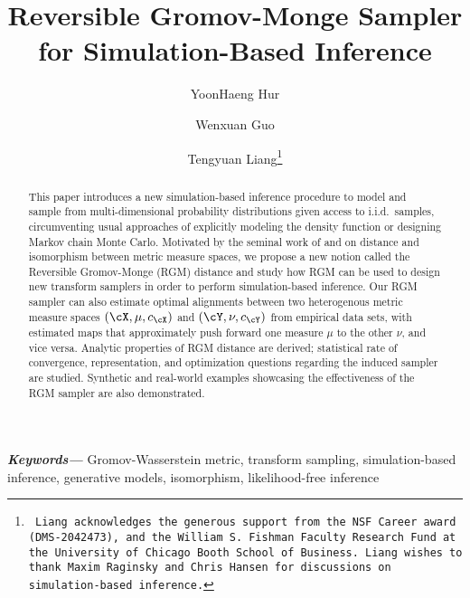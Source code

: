 \documentclass[11pt]{article}
\providecommand{\keywords}[1]{\small \textbf{\textit{Keywords---}} #1}
\begin{document}
\title{Reversible Gromov-Monge Sampler for Simulation-Based Inference}

\author{YoonHaeng Hur}
\author{Wenxuan Guo}
\author{Tengyuan Liang\thanks{\tt 
Liang acknowledges the generous support from the NSF Career award (DMS-2042473), and the William S. Fishman Faculty Research Fund at the University of Chicago Booth School of Business. Liang wishes to thank Maxim Raginsky and Chris Hansen for discussions on simulation-based inference.}}


\maketitle

\begin{abstract}
	This paper introduces a new simulation-based inference procedure to model and sample from multi-dimensional probability distributions given access to i.i.d.\ samples, circumventing usual approaches of explicitly modeling the density function or designing Markov chain Monte Carlo. Motivated by the seminal work of \cite{memoli_2011} and \cite{sturm_2012} on distance and isomorphism between metric measure spaces, we propose a new notion called the Reversible Gromov-Monge (RGM) distance and study how RGM can be used to design new transform samplers in order to perform simulation-based inference. Our RGM sampler can also estimate optimal alignments between two heterogenous metric measure spaces $(\cX, \mu, c_{\cX})$ and $(\cY, \nu, c_{\cY})$ from empirical data sets, with estimated maps that approximately push forward one measure $\mu$ to the other $\nu$, and vice versa. Analytic properties of RGM distance are derived; statistical rate of convergence, representation, and optimization questions regarding the induced sampler are studied. Synthetic and real-world examples showcasing the effectiveness of the RGM sampler are also demonstrated.
\end{abstract}

\keywords{Gromov-Wasserstein metric, transform sampling, simulation-based inference, generative models, isomorphism, likelihood-free inference}

\fi

\end{document}
